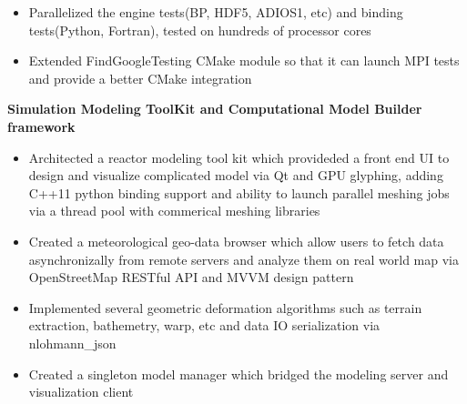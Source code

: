 \begin{cventries}
{\begin{cvitems}
\begin{itemize}
              \item {Parallelized the engine tests(BP, HDF5, ADIOS1, etc) and binding tests(Python, Fortran), tested on hundreds of processor cores}
              \item {Extended FindGoogleTesting CMake module so that it can launch MPI tests and provide a better CMake integration}
          \end{itemize}
        \item {\fontsize{10pt}{1em}\bodyfont\bfseries\color{darktext}Simulation Modeling ToolKit and Computational Model Builder framework}
          \begin{itemize}
              \item {Architected a reactor modeling tool kit which provideded a front end UI to design and visualize complicated model via Qt and GPU glyphing, adding C++11 python binding support and ability to launch parallel meshing jobs via a thread pool with commerical meshing libraries}
              \item {Created a meteorological geo-data browser which allow users to fetch data asynchronizally from remote servers and analyze them on real world map via OpenStreetMap RESTful API and MVVM design pattern}
              \item {Implemented several geometric deformation algorithms such as terrain extraction, bathemetry, warp, etc and data I\/O serialization via nlohmann\_json}
              \item {Created a singleton model manager which bridged the modeling server and visualization client}
          \end{itemize}
      \end{cvitems}
    }


\end{cventries}
